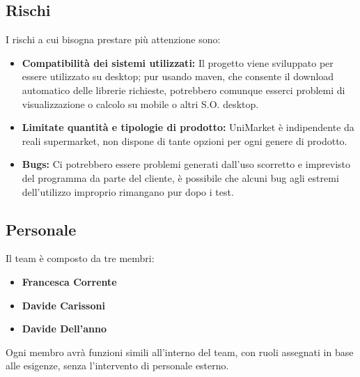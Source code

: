 \documentclass[a4paper,12pt]{article}
\begin{document}
\subsection{Rischi} %
I rischi a cui bisogna prestare più attenzione sono: 
\begin{itemize}
    \item \textbf{Compatibilità dei sistemi utilizzati:} 
    Il progetto viene sviluppato per essere utilizzato su desktop; pur usando maven, che consente il download automatico delle librerie richieste, potrebbero comunque esserci problemi di visualizzazione o calcolo su mobile o altri S.O. desktop. 
    \item \textbf{Limitate quantità e tipologie di prodotto:} 
    UniMarket è indipendente da reali supermarket, non dispone di tante opzioni per ogni genere di prodotto. 
    \item \textbf{Bugs:} 
    Ci potrebbero essere problemi generati dall’uso scorretto e imprevisto del programma da parte del cliente,
    è possibile che alcuni bug agli estremi dell’utilizzo improprio rimangano pur dopo i test. 
\end{itemize}

\subsection{Personale} %
Il team è composto da tre membri:\begin{itemize}
    \item \textbf{Francesca Corrente} 
    \item \textbf{Davide Carissoni} 
    \item \textbf{Davide Dell’anno} 
\end{itemize}
Ogni membro avrà funzioni simili all’interno del team, con ruoli assegnati in base alle esigenze, senza l’intervento di personale esterno.
\end{document}

